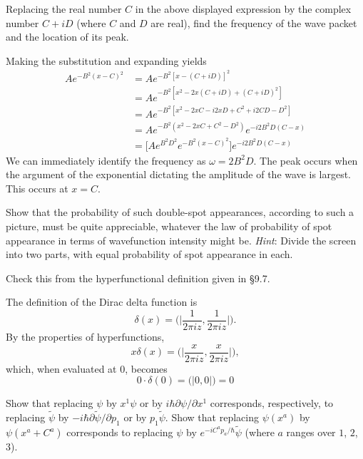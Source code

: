\documentclass[../road-to-reality.tex]{subfiles}
\begin{document}
\begin{questions}
\question Replacing the real number $C$ in the above displayed expression by the complex number $C + iD$ (where $C$ and $D$ are real), find the frequency of the wave packet and the location of its peak.

\begin{solution}
	Making the substitution and expanding yields
	\begin{align*}
		Ae^{-B^2(x-C)^2} &= Ae^{-B^2[x-(C+iD)]^2} \\
		&= Ae^{-B^2[x^2 - 2x(C + iD) + (C + iD)^2]} \\
		&= Ae^{-B^2[x^2 - 2xC - i2xD + C^2 + i2CD - D^2]} \\
		&= Ae^{-B^2(x^2-2xC+C^2-D^2)}e^{-i2B^2D(C-x)} \\
		&= \big[Ae^{B^2D^2}e^{-B^2(x-C)^2}\big]e^{-i2B^2D(C-x)}
	\end{align*}
	We can immediately identify the frequency as $\omega = 2B^2D$. The peak occurs when the argument of the exponential dictating the amplitude of the wave is largest. This occurs at $x = C$.
\end{solution}

\question Show that the probability of such double-spot appearances, according to such a picture, must be quite appreciable, whatever the law of probability of spot appearance in terms of wavefunction intensity might be. \textit{Hint}: Divide the screen into two parts, with equal probability of spot appearance in each.

\question Check this from the hyperfunctional definition given in \S9.7.

\begin{solution}
	The definition of the Dirac delta function is
	\[
		\delta(x) = \Big(\!\!\big|\frac{1}{2\pi{i}z}, \frac{1}{2\pi{i}z}\big|\!\!\Big).
	\]
	By the properties of hyperfunctions,
	\[
		x\delta(x) = \Big(\!\!\big|\frac{x}{2\pi{i}z}, \frac{x}{2\pi{i}z}\big|\!\!\Big),
	\]
	which, when evaluated at $0$, becomes
	\[
		0\cdot\delta(0) = \Big(\!\!\big|0, 0\big|\!\!\Big) = 0
	\]
\end{solution}

\question Show that replacing $\psi$ by $x^1\psi$ or by $i\hbar\partial\psi/\partial{x^1}$ corresponds, respectively, to replacing $\tilde{\psi}$ by $-i\hbar\partial\tilde{\psi}/\partial{p_1}$ or by $p_1\tilde{\psi}$. Show that replacing $\psi(x^a)$ by $\psi(x^a + C^a)$ corresponds to replacing $\psi$ by $e^{-iC^ap_a/\hbar}\tilde{\psi}$ (where $a$ ranges over $1$, $2$, $3$).


\end{questions}
\end{document}

